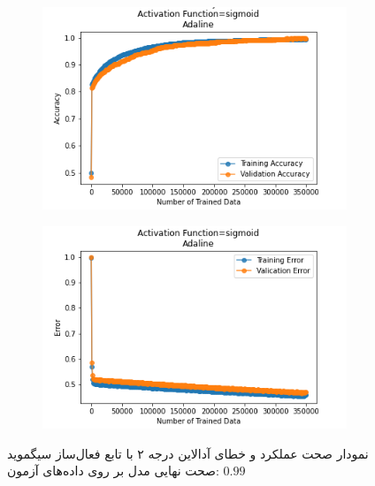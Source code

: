 \documentclass[12pt, a4paper]{article}
\begin{document}
\clearpage

\begin{figure}[h]
    \begin{subfigure}{0.45\linewidth}
        \centering
        \includegraphics[width=\linewidth]{images/6/adaline/activation_func/sigmoid_acc.png}
    \end{subfigure}
    \hfil
    \begin{subfigure}{0.45\linewidth}
        \centering
        \includegraphics[width=\linewidth]{images/6/adaline/activation_func/sigmoid_error.png}
    \end{subfigure}
    \caption{نمودار صحت عملکرد‌ و خطای آدالاین درجه ۲ با تابع فعال‌ساز سیگموید
    \newline
    صحت نهایی مدل بر روی داده‌های آزمون: $0.99$}
\end{figure}
\end{document}
